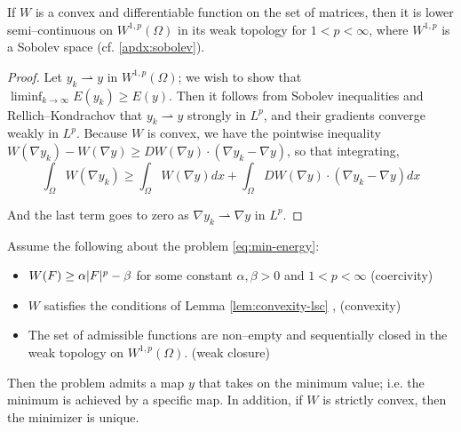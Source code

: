 \documentclass[../main.tex]{subfiles}
\begin{document}
\begin{lem}
	\label{lem:convexity-lsc}
	If $W$ is a convex and differentiable function on the set of matrices, then it is lower semi--continuous on $W^{1,p}(\Omega)$ in its weak topology for $1 < p < \infty$, where $W^{1,p}$ is a Sobolev space (cf. \ref{apdx:sobolev}).
\end{lem}

\begin{proof}
	Let $y_k \rightharpoonup y$ in $W^{1,p}(\Omega)$; we wish to show that $\liminf_{k \to \infty} E(y_k) \geq E(y)$.
	Then it follows from Sobolev inequalities and Rellich--Kondrachov that $y_k \rightharpoonup y$ strongly in $L^p$, and their gradients converge weakly in $L^p$.
	Because $W$ is convex, we have the pointwise inequality $W(\nabla y_k) - W(\nabla y) \geq  DW(\nabla y) \cdot (\nabla y_{k} - \nabla y)$, so that integrating,
	\begin{equation*}
		\int_{\Omega} W(\nabla y_k) \geq \int_{\Omega} W(\nabla y) dx + \int_{\Omega} DW ( \nabla y) \cdot (\nabla y_k - \nabla y) dx
	\end{equation*}

	And the last term goes to zero as $\nabla y_{k} \rightharpoonup \nabla y$ in $L^p$.
\end{proof}

\begin{thm}
	Assume the following about the problem \eqref{eq:min-energy}:
	\begin{itemize}
		\item $W(F) \geq \alpha \lvert F\rvert^p - \beta$ for some constant $\alpha, \beta > 0$ and $1 < p < \infty$ (coercivity)
		\item $W$ satisfies the conditions of Lemma \ref{lem:convexity-lsc} , (convexity)
		\item The set of admissible functions are non--empty and sequentially closed in the weak topology on $W^{1,p}(\Omega)$. (weak closure)
	\end{itemize}

	Then the problem admits a map $y$ that takes on the minimum value; i.e. the minimum is achieved by a specific map.
	In addition, if $W$ is strictly convex, then the minimizer is unique.
\end{thm}
\end{document}
